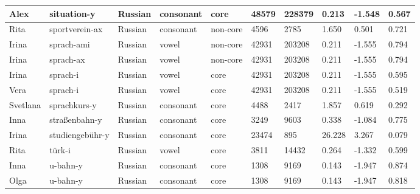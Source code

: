 \begin{longtable}{|p{1.2cm}|p{3cm}|p{1cm}|p{1.5cm}|p{1.5cm}|R{1.2cm}|R{1cm}|R{1cm}|R{0.8cm}|R{0.8cm}|}
Alex      & situation-y            & Russian       & consonant        & core      & 48579        & 228379         & 0.213                 & -1.548            & 0.567        \\ \hline
Rita      & sportverein-ax         & Russian       & consonant        & non-core  & 4596         & 2785           & 1.650                 & 0.501             & 0.721        \\ \hline
Irina     & sprach-ami             & Russian       & vowel            & non-core  & 42931        & 203208         & 0.211                 & -1.555            & 0.794        \\ \hline
Irina     & sprach-ax              & Russian       & vowel            & non-core  & 42931        & 203208         & 0.211                 & -1.555            & 0.794        \\ \hline
Irina     & sprach-i               & Russian       & vowel            & core      & 42931        & 203208         & 0.211                 & -1.555            & 0.595        \\ \hline
Vera      & sprach-i               & Russian       & vowel            & core      & 42931        & 203208         & 0.211                 & -1.555            & 0.519        \\ \hline
Svetlana  & sprachkurs-y           & Russian       & consonant        & core      & 4488         & 2417           & 1.857                 & 0.619             & 0.292        \\ \hline
Inna      & straßenbahn-y          & Russian       & consonant        & core      & 3249         & 9603           & 0.338                 & -1.084            & 0.775        \\ \hline
Irina     & studiengeb\"{u}hr-y    & Russian       & consonant        & core      & 23474        & 895            & 26.228                & 3.267             & 0.079        \\ \hline
Rita      & t\"{u}rk-i             & Russian       & vowel            & core      & 3811         & 14432          & 0.264                 & -1.332            & 0.599        \\ \hline
Inna      & u-bahn-y               & Russian       & consonant        & core      & 1308         & 9169           & 0.143                 & -1.947            & 0.874        \\ \hline
Olga      & u-bahn-y               & Russian       & consonant        & core      & 1308         & 9169           & 0.143                 & -1.947            & 0.818        \\ \hline

\end{longtable}
